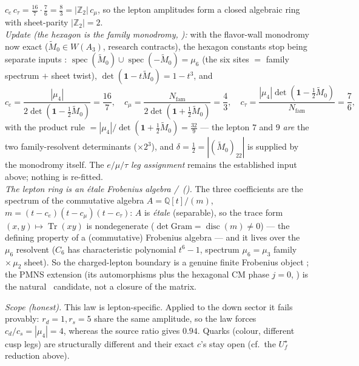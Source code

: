 \documentclass[11pt,a4paper]{article}
\newcommand{\Nfam}{N_{\mathrm{fam}}}
\newcommand{\Z}{\mathbb{Z}}
\theoremstyle{definition}
\begin{document}
\begin{keybox}[Where the lepton rationals come from: $\delta=\tfrac12$ resolvent $+$ product rule \mE]
$c_e\,c_\tau=\tfrac{16}7\!\cdot\!\tfrac76=\tfrac83=|\Z_2|\,c_\mu$, so the lepton amplitudes form a closed
algebraic ring with sheet-parity $|\Z_2|=2$. \,\allowbreak{}\,\allowbreak{}
\smallskip\\
\noindent\emph{Update (the hexagon is the family monodromy, ):}
with the flavor-wall monodromy now exact ($\widetilde M_0\in W(A_3)$, research contracts), the hexagon
constants stop being separate inputs \mE: $\operatorname{spec}(\widetilde M_0)\cup\operatorname{spec}(-\widetilde M_0)=\mu_6$
(the six sites $=$ family spectrum $+$ sheet twist), $\det(\mathbf1-t\widetilde M_0)=1-t^3$, and
\[
  c_e=\frac{|\mu_4|}{2\det(\mathbf1-\tfrac12\widetilde M_0)}=\frac{16}{7},\quad
  c_\mu=\frac{\Nfam}{2\det(\mathbf1+\tfrac12\widetilde M_0)}=\frac{4}{3},\quad
  c_\tau=\frac{|\mu_4|\det(\mathbf1-\tfrac12\widetilde M_0)}{\Nfam}=\frac{7}{6},
\]
with the product rule $=|\mu_4|/\det(\mathbf1+\tfrac12\widetilde M_0)=\tfrac{32}9$ --- the lepton $7$
and $9$ \emph{are} the two family-resolvent determinants ($\times2^3$), and $\delta=\tfrac12=
|(\widetilde M_0)_{22}|$ is supplied by the monodromy itself. The $e/\mu/\tau$ \emph{leg assignment}
remains the established input above; nothing is re-fitted.
\smallskip\\
\noindent\emph{The lepton ring is an \'etale Frobenius algebra \mE/\mC\ ().}
The three coefficients are the spectrum of the commutative algebra $A=\mathbb Q[t]/(m)$,
$m=(t{-}c_e)(t{-}c_\mu)(t{-}c_\tau)$: $A$ is \emph{\'etale} (separable), so the trace form
$(x,y)\mapsto\operatorname{Tr}(xy)$ is nondegenerate ($\det\mathrm{Gram}=\operatorname{disc}(m)\neq0$) --- the
defining property of a (commutative) Frobenius algebra --- and it lives over the $\mu_6$ resolvent
($C_6$ has characteristic polynomial $t^6{-}1$, spectrum $\mu_6=\mu_3$ family $\times\,\mu_2$ sheet). So the
charged-lepton boundary is a genuine finite Frobenius object \mE; the PMNS extension (its automorphisms plus
the hexagonal CM phase $j{=}0$, ) is the natural \mC\ candidate, not a
closure of the matrix.

\smallskip
\noindent\emph{Scope (honest).} This law is lepton-specific. Applied to the down sector it fails provably:
$r_d{=}1,r_s{=}5$ share the same amplitude, so the law forces $c_d/c_s{=}|\mu_4|{=}4$, whereas the source
ratio gives $0.94$. Quarks (colour, different cusp legs) are structurally different and their exact $c$'s
stay open (cf.\ the $U_f^\star$ reduction above).
\end{keybox}
\end{document}
